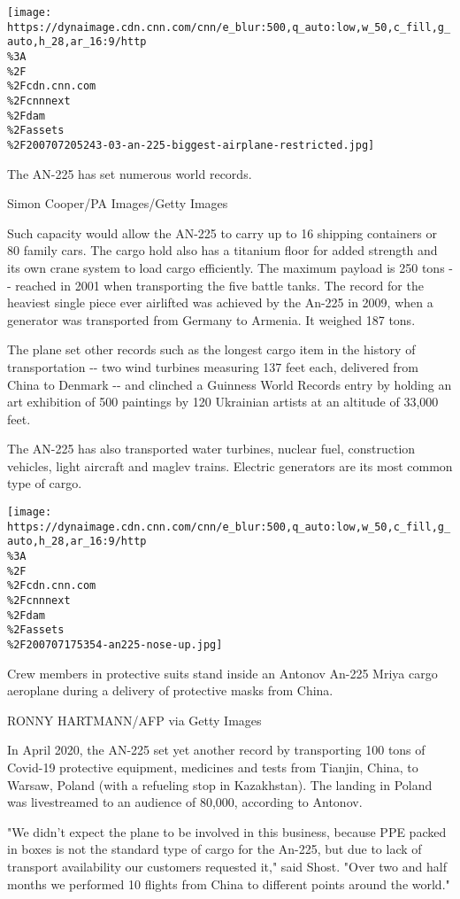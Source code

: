 \texttt{[image: https://dynaimage.cdn.cnn.com/cnn/e\_blur:500,q\_auto:low,w\_50,c\_fill,g\_auto,h\_28,ar\_16:9/http\\\%3A\\\%2F\\\%2Fcdn.cnn.com\\\%2Fcnnnext\\\%2Fdam\\\%2Fassets\\\%2F200707205243-03-an-225-biggest-airplane-restricted.jpg]}

The AN-225 has set numerous world records.

Simon Cooper/PA Images/Getty Images

Such capacity would allow the AN-225 to carry up to 16 shipping
containers or 80 family cars. The cargo hold also has a titanium floor
for added strength and its own crane system to load cargo efficiently.
The maximum payload is 250 tons -\/- reached in 2001 when transporting
the five battle tanks. The record for the heaviest single piece ever
airlifted was achieved by the An-225 in 2009, when a generator was
transported from Germany to Armenia. It weighed 187 tons.

The plane set other records such as the longest cargo item in the
history of transportation -\/- two wind turbines measuring 137 feet
each, delivered from China to Denmark -\/- and clinched a Guinness World
Records entry by holding an art exhibition of 500 paintings by 120
Ukrainian artists at an altitude of 33,000 feet.

The AN-225 has also transported water turbines, nuclear fuel,
construction vehicles, light aircraft and maglev trains. Electric
generators are its most common type of cargo.

\texttt{[image: https://dynaimage.cdn.cnn.com/cnn/e\_blur:500,q\_auto:low,w\_50,c\_fill,g\_auto,h\_28,ar\_16:9/http\\\%3A\\\%2F\\\%2Fcdn.cnn.com\\\%2Fcnnnext\\\%2Fdam\\\%2Fassets\\\%2F200707175354-an225-nose-up.jpg]}

Crew members in protective suits stand inside an Antonov An-225 Mriya
cargo aeroplane during a delivery of protective masks from China.

RONNY HARTMANN/AFP via Getty Images

In April 2020, the AN-225 set yet another record by transporting 100
tons of Covid-19 protective equipment, medicines and tests from Tianjin,
China, to Warsaw, Poland (with a refueling stop in Kazakhstan). The
landing in Poland was livestreamed to an audience of 80,000, according
to Antonov.

"We didn't expect the plane to be involved in this business, because PPE
packed in boxes is not the standard type of cargo for the An-225, but
due to lack of transport availability our customers requested it," said
Shost. "Over two and half months we performed 10 flights from China to
different points around the world."

